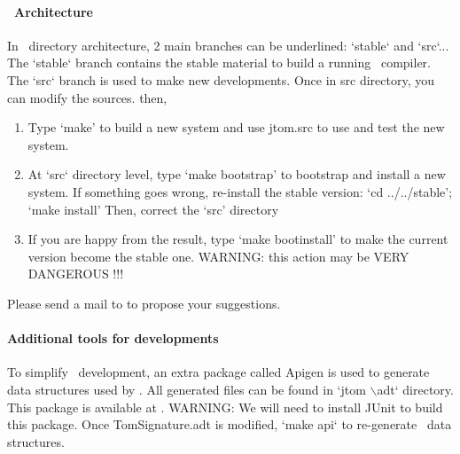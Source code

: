 \paragraph{\TOM\ Architecture}
In \TOM\ directory architecture, 2 main branches can be underlined:
`stable` and `src`...
The `stable` branch contains the stable material to build a running
\TOM\ compiler. The `src` branch is used to make new developments.
Once in src directory, you can modify the sources. then, 
\begin{enumerate}
\item Type `make' to build a new system and use jtom.src to use and
  test the new system.
\item At `src` directory level, type `make bootstrap' to bootstrap and
  install a new system.
  If something goes wrong, re-install the stable version:
  `cd ../../stable'; `make install'
  Then, correct the `src' directory
\item If you are happy from the result, type `make bootinstall' to
  make the current version become the stable one.   WARNING: this action may be VERY DANGEROUS !!!
\end{enumerate}
Please send a mail to  to propose your
suggestions.

\paragraph{Additional tools for developments}
To simplify \TOM\ development, an extra package called Apigen is used
to generate data structures used by \TOM. All generated files can be
found in `jtom $\backslash$adt` directory.
\\This package is available at
.
WARNING: We will need to install JUnit to build this package.
Once TomSignature.adt is modified, `make api` to re-generate \TOM\
data structures.
